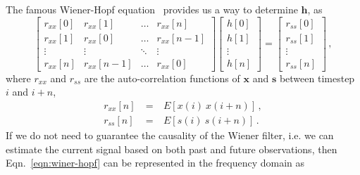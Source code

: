 \documentclass[paper-main.tex]{subfiles}
\begin{document}
The famous Wiener-Hopf equation~\citep{noble1959methods} provides us a way to determine $\textbf{h}$, as
\begin{equation}
\label{eqn:winer-hopf}
\begin{bmatrix}  
r_{xx}[0]&r_{xx}[1]&\dots& r_{xx}[n]\\
r_{xx}[1]&r_{xx}[0]&\dots &r_{xx}[n-1]\\
\vdots&\vdots&\ddots&\vdots\\
r_{xx}[n]&r_{xx}[n-1]&\dots &r_{xx}[0]
\end{bmatrix}
\begin{bmatrix}
h[0]\\
h[1]\\
\vdots\\
h[n]
\end{bmatrix}=
\begin{bmatrix}
r_{ss}[0]\\
r_{ss}[1]\\
\vdots\\
r_{ss}[n]
\end{bmatrix}\,,
\end{equation}
where $r_{xx}$ and $r_{ss}$ are the auto-correlation functions of $\mathbf{x}$ and $\mathbf{s}$ between timestep $i$ and $i+n$, 
\begin{eqnarray} 
r_{xx}[n] &~=~& E[x(i)~x(i+n)] \,,\\
r_{ss}[n] &~=~& E[s(i)~s(i+n)] \,.
\end{eqnarray} 
If we do not need to guarantee the causality of the Wiener filter, i.e. we can estimate the current signal based on both past and future observations, then Eqn.~\ref{eqn:winer-hopf} can be represented in the frequency domain as
\end{document}

